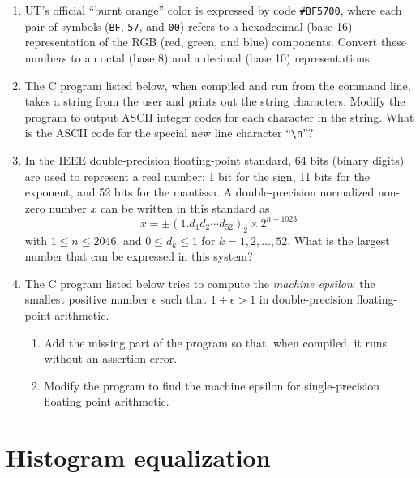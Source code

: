 \begin{enumerate}

\item UT's official ``burnt orange'' color is expressed by code
  \texttt{\#BF5700}, where each pair of symbols (\texttt{BF},
  \texttt{57}, and \texttt{00}) refers to a hexadecimal (base 16)
  representation of the RGB (red, green, and blue) components. Convert these
  numbers to an octal (base 8) and a decimal (base 10) representations.

\item The C program listed below, when compiled and
  run from the command line, takes a string from the user and prints
  out the string characters. Modify the program to output ASCII
  integer codes for each character in the string. What is the ASCII
  code for the special new line character ``\verb+\n+''?

\lstset{language=c,numbers=left,numberstyle=\tiny,showstringspaces=false}


\item In the IEEE double-precision floating-point standard, 64 bits
  (binary digits) are used to represent a real number: 1 bit for the
  sign, 11 bits for the exponent, and 52 bits for the mantissa. A
  double-precision normalized non-zero number $x$ can be written in
  this standard as 
  \[
  x = \pm (1.d_1d_2{\cdots}d_{52})_2 \times 2^{n-1023}\,
  \]
  with $1 \le n \le 2046$, and $0 \le d_k \le 1$ for
  $k=1,2,\ldots,52$. What is the largest number that can be expressed
  in this system?

\item The C program listed below tries to compute the \emph{machine
    epsilon}: the smallest positive number $\epsilon$ such that
  $1+\epsilon > 1$ in double-precision floating-point arithmetic. 

\begin{enumerate}
\item Add the missing part of the program so that, when compiled, it
  runs without an assertion error.
\item Modify the program to find the machine epsilon for single-precision floating-point arithmetic.
\end{enumerate}



\end{enumerate}


\section{Histogram equalization}

